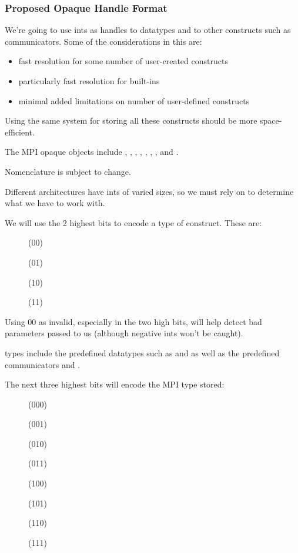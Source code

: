 \documentclass{article}
\begin{document}
\subsubsection{Proposed Opaque Handle Format}

We're going to use ints as handles to datatypes and to other constructs such
as communicators.  Some of the considerations in this are:
\begin{itemize}
\item fast resolution for some number of user-created constructs
\item particularly fast resolution for built-ins
\item minimal added limitations on number of user-defined constructs 
\end{itemize}

Using the same system for storing all these constructs should be more
space-efficient.

The MPI opaque objects include , ,
, , ,
, , and .

Nomenclature is subject to change.

Different architectures have ints of varied sizes, so we must rely on
 to determine what we have to work with.

We will use the 2 highest bits to encode a type of construct.  These are:
\begin{description}
\item[]  (00)
\item[]  (01)
\item[]   (10)
\item[] (11)
\end{description}

Using 00 as invalid, especially in the two high bits, will help detect
bad parameters passed to us (although negative ints won't be caught).

 types include the predefined datatypes such as
 and  as well as the predefined communicators
 and .

The next three highest bits will encode the MPI type stored:
\begin{description}
\item[]     (000)
\item[]    (001)
\item[] (010)
\item[]     (011)
\item[](100)
\item[]       (101)
\item[]     (110)
\item[]      (111)
\end{description}
\end{document}
